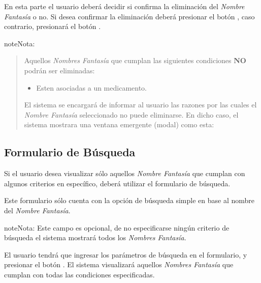 \documentclass[a4paper,10pt,spanish]{sphinxmanual}
\begin{document}
En esta parte el usuario deberá decidir si confirma la eliminación del \emph{Nombre Fantasía} o no. Si desea confirmar la eliminación deberá presionar el botón , caso contrario, presionará el botón .

\begin{notice}{note}{Nota:}\begin{quote}

Aquellos \emph{Nombres Fantasía} que cumplan las siguientes condiciones \textbf{NO} podrán ser eliminadas:
\begin{itemize}
\item {} 
Esten asociadas a un medicamento.

\end{itemize}

El sistema se encargará de informar al usuario las razones por las cuales el \emph{Nombre Fantasía} seleccionado no puede eliminarse. En dicho caso, el sistema mostrara una ventana emergente (modal) como esta:
\end{quote}

\end{notice}


\subsection{Formulario de Búsqueda}
\label{nombresfantasia:formulario-busqueda-nombre-fantasia}\label{nombresfantasia:formulario-de-busqueda}
Si el usuario desea visualizar sólo aquellos \emph{Nombre Fantasía} que cumplan con algunos criterios en específico, deberá utilizar el formulario de búsqueda.


Este formulario sólo cuenta con la opción de búsqueda simple en base al nombre del \emph{Nombre Fantasía}.

\begin{notice}{note}{Nota:}
Este campo es opcional, de no especificarse ningún criterio de búsqueda el sistema mostrará todos los \emph{Nombres Fantasía}.
\end{notice}

El usuario tendrá que ingresar los parámetros de búsqueda en el formulario, y presionar el botón . El sistema visualizará aquellos \emph{Nombres Fantasía} que cumplan con todas las condiciones especificadas.
\end{document}
